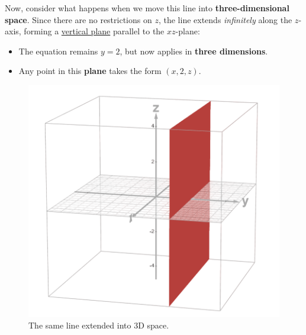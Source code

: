 \documentclass{article}
\begin{document}
\begin{examplebox}
\bigskip
\bigskip

Now, consider what happens when we move this line into \textbf{three-dimensional space}. Since there are no restrictions on \( z \), the line extends \textit{infinitely} along the \( z \)-axis, forming a \underline{vertical plane} parallel to the \( xz \)-plane:

\begin{minipage}{0.55\textwidth}
    \vspace{1em}
    \begin{itemize}
        \item The equation remains \( y = 2 \), but now applies in \textbf{three dimensions}.
        \item Any point in this \textbf{plane} takes the form \( (x, 2, z) \).
    \end{itemize}
    \vspace{1em}
\end{minipage}
\begin{minipage}{0.4\textwidth}
    \begin{figure}[H]
        \centering
        \includegraphics[width=\textwidth]{y = 2 plane.png}
        \caption{The same line extended into 3D space.}
        \label{fig:line_3d}
    \end{figure}
\end{minipage}

\end{examplebox}
\end{document}
